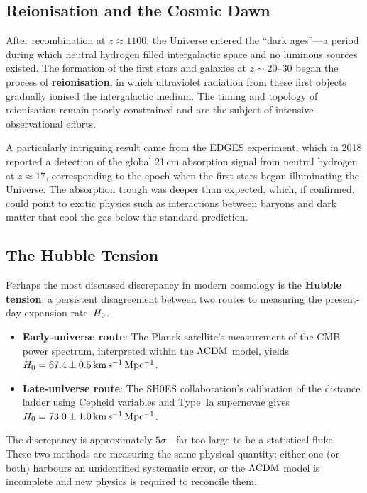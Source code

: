 \subsection*{Reionisation and the Cosmic Dawn}

After recombination at $z\approx 1100$, the Universe entered the ``dark ages''---a period during which neutral hydrogen filled intergalactic space and no luminous sources existed. The formation of the first stars and galaxies at $z\sim 20$--$30$ began the process of \textbf{reionisation}, in which ultraviolet radiation from these first objects gradually ionised the intergalactic medium. The timing and topology of reionisation remain poorly constrained and are the subject of intensive observational efforts.

A particularly intriguing result came from the EDGES experiment, which in 2018 reported a detection of the global 21\,cm absorption signal from neutral hydrogen at $z\approx 17$, corresponding to the epoch when the first stars began illuminating the Universe. The absorption trough was deeper than expected, which, if confirmed, could point to exotic physics such as interactions between baryons and dark matter that cool the gas below the standard prediction.

\subsection*{The Hubble Tension}

Perhaps the most discussed discrepancy in modern cosmology is the \textbf{Hubble tension}: a persistent disagreement between two routes to measuring the present-day expansion rate~$H_0$.
\begin{itemize}
    \item \textbf{Early-universe route}: The Planck satellite's measurement of the CMB power spectrum, interpreted within the $\Lambda\mathrm{CDM}$ model, yields $H_0 = 67.4 \pm 0.5\,\mathrm{km\,s^{-1}\,Mpc^{-1}}$.
    \item \textbf{Late-universe route}: The SH0ES collaboration's calibration of the distance ladder using Cepheid variables and Type~Ia supernovae gives $H_0 = 73.0 \pm 1.0\,\mathrm{km\,s^{-1}\,Mpc^{-1}}$.
\end{itemize}
The discrepancy is approximately $5\sigma$---far too large to be a statistical fluke. These two methods are measuring the same physical quantity; either one (or both) harbours an unidentified systematic error, or the $\Lambda\mathrm{CDM}$ model is incomplete and new physics is required to reconcile them.

